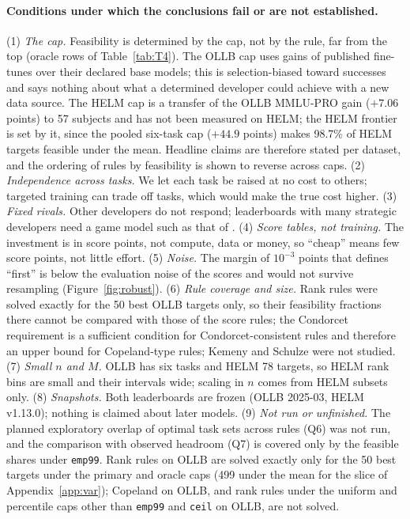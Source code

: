 \documentclass{article}
\begin{document}
\paragraph{Conditions under which the conclusions fail or are not established.}
(1) \emph{The cap.} Feasibility is determined by the cap, not by the rule, far from the top (oracle rows of Table~\ref{tab:T4}). The OLLB cap uses gains of published fine-tunes over their declared base models; this is selection-biased toward successes and says nothing about what a determined developer could achieve with a new data source. The HELM cap is a transfer of the OLLB MMLU-PRO gain ($+7.06$ points) to 57 subjects and has not been measured on HELM; the HELM frontier is set by it, since the pooled six-task cap ($+44.9$ points) makes 98.7\% of HELM targets feasible under the mean. Headline claims are therefore stated per dataset, and the ordering of rules by feasibility is shown to reverse across caps. (2) \emph{Independence across tasks.} We let each task be raised at no cost to others; targeted training can trade off tasks, which would make the true cost higher. (3) \emph{Fixed rivals.} Other developers do not respond; leaderboards with many strategic developers need a game model such as that of \citet{chen2026incentives}. (4) \emph{Score tables, not training.} The investment is in score points, not compute, data or money, so ``cheap'' means few score points, not little effort. (5) \emph{Noise.} The margin of $10^{-3}$ points that defines ``first'' is below the evaluation noise of the scores and would not survive resampling (Figure~\ref{fig:robust}). (6) \emph{Rule coverage and size.} Rank rules were solved exactly for the 50 best OLLB targets only, so their feasibility fractions there cannot be compared with those of the score rules; the Condorcet requirement is a sufficient condition for Condorcet-consistent rules and therefore an upper bound for Copeland-type rules; Kemeny and Schulze were not studied. (7) \emph{Small $n$ and $M$.} OLLB has six tasks and HELM 78 targets, so HELM rank bins are small and their intervals wide; scaling in $n$ comes from HELM subsets only. (8) \emph{Snapshots.} Both leaderboards are frozen (OLLB 2025-03, HELM v1.13.0); nothing is claimed about later models. (9) \emph{Not run or unfinished.} The planned exploratory overlap of optimal task sets across rules (Q6) was not run, and the comparison with observed headroom (Q7) is covered only by the feasible shares under \texttt{emp99}. Rank rules on OLLB are solved exactly only for the 50 best targets under the primary and oracle caps (499 under the mean for the slice of Appendix~\ref{app:var}); Copeland on OLLB, and rank rules under the uniform and percentile caps other than \texttt{emp99} and \texttt{ceil} on OLLB, are not solved.
\end{document}
